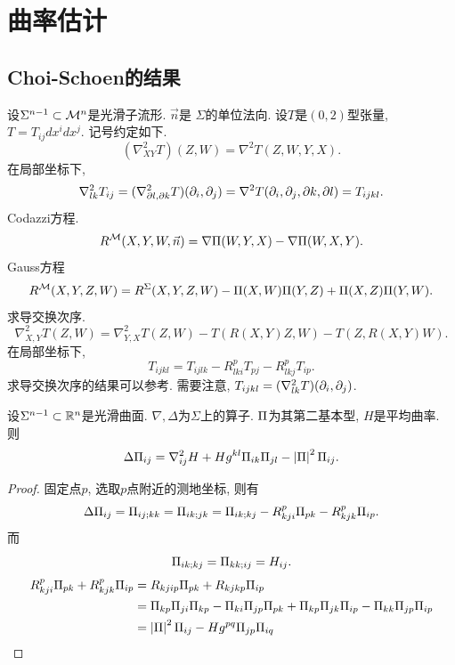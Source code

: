 \chapter{曲率估计}
\section{Choi-Schoen的结果}
设$\Sigma^{n-1} \subset {\mathcal{M}}^n$是光滑子流形. $\vec{n}$是 $\Sigma$的单位法向. 设$T$是$(0,2)$型张量, $T=T_{ij}dx^idx^j$. 记号约定如下.
\begin{equation}
    (\nabla^2_{XY}T)(Z,W)=\nabla^2T(Z,W,Y,X).
\end{equation}
在局部坐标下,
\begin{equation}
    \nabla^2_{lk}T_{ij}=(\nabla^2_{\partial l,\partial k}T)({\partial_i},{\partial_j})=\nabla^2T({\partial_i},{\partial_j}, \partial k,\partial l)=T_{ijkl}.
\end{equation}
Codazzi方程.
\begin{equation}
    R^{\mathcal{M}}(X,Y,W,\vec{n}) = \nabla {\Pi}(W,Y,X) - \nabla {\Pi} (W,X,Y).
\end{equation}
Gauss方程
\begin{equation}
    R^{\mathcal{M}}(X,Y,Z,W) = R^\Sigma(X,Y,Z,W)-{\Pi}(X,W){\Pi}(Y,Z)+{\Pi}(X,Z){\Pi}(Y,W).
\end{equation}
求导交换次序.
\begin{equation}
    \nabla^2_{X,Y}T(Z,W) = \nabla^2_{Y,X}T(Z,W)-T(R(X,Y)Z,W)-T(Z,R(X,Y)W).
\end{equation}
在局部坐标下,
\begin{equation}
    T_{ijkl}=T_{ijlk}-R_{lki}^pT_{pj}-R_{lkj}^pT_{ip}.
\end{equation}
求导交换次序的结果可以参考\cite[定理7.14]{lee}. 需要注意, $T_{ijkl}=(\nabla^2_{lk}T)({\partial_i},{\partial_j})$.  
\begin{proposition}
    设$\Sigma^{n-1} \subset \mathbb{R}^n$是光滑曲面. $\nabla, \Delta$为$\Sigma$上的算子. ${\Pi}$为其第二基本型, $H$是平均曲率. 则
    \begin{equation} \label{simon1}
        \Delta {\Pi}_{ij}=\nabla^2_{ij}H + Hg^{kl}{\Pi}_{ik}{\Pi}_{jl}-\left | {\Pi} \right |^2{\Pi}_{ij}.
    \end{equation}
\end{proposition}
\begin{proof}
    固定点$p$, 选取$p$点附近的测地坐标, 则有
    \begin{equation}
        \Delta {\Pi}_{ij}={\Pi}_{ij;kk}={\Pi}_{ik;jk}={\Pi}_{ik;kj}-R_{kji}^p{\Pi}_{pk}-R_{kjk}^p{\Pi}_{ip}.
    \end{equation}
    而
    \begin{equation}
        {\Pi}_{ik;kj}={\Pi}_{kk;ij}=H_{ij}.
    \end{equation}
    \begin{equation}
        \begin{split}
            R_{kji}^p{\Pi}_{pk}+R_{kjk}^p{\Pi}_{ip} &= R_{kjip}{\Pi}_{pk}+R_{kjkp}{\Pi}_{ip}\\
            &={\Pi}_{kp}{\Pi}_{ji}{\Pi}_{kp}-{\Pi}_{ki}{\Pi}_{jp}{\Pi}_{pk}+{\Pi}_{kp}{\Pi}_{jk}{\Pi}_{ip}-{\Pi}_{kk}{\Pi}_{jp}{\Pi}_{ip} \\
            &=\left | {\Pi} \right |^2{\Pi}_{ij}-Hg^{pq}{\Pi}_{jp}{\Pi}_{iq}
        \end{split}
    \end{equation}
\end{proof}
